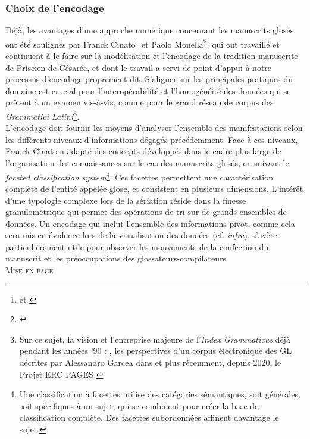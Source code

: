 \documentclass[a4paper, twoside, 12pt]{book}
\begin{document}
\subsubsection{Choix de l'encodage}

Déjà, les avantages d'une approche numérique concernant les manuscrits glosés ont été soulignés par Franck Cinato\footnote{\cite{cinato2015priscien} et \cite{cinato2011perspectives}} et Paolo Monella\footnote{\cite{monella2019digital}}, qui ont travaillé et continuent à le faire sur la modélisation et l'encodage de la tradition manuscrite de Priscien de Césarée, et dont le travail a servi de point d'appui à notre processus d'encodage proprement dit. S'aligner sur les principales pratiques du domaine est crucial pour l'interopérabilité et l'homogénéité des données qui se prêtent à un examen vis-à-vis, comme pour le grand réseau de corpus des \textit{Grammatici Latini}\footnote{Sur ce sujet, la vision et l'entreprise majeure de l'\textit{Index Grammaticus} déjà pendant les années '90 : \cite{lomanto1990index}, les perspectives d'un corpus électronique des GL décrites par Alessandro Garcea dans \cite{garcea2010corpus} et plus récemment, depuis 2020, le Projet ERC PAGES \cite{spangenberg2022pages}}.\\

L'encodage doit fournir les moyens d'analyser l'ensemble des manifestations selon les différents niveaux d'informations dégagés précédemment. Face à ces niveaux, Franck Cinato a adapté des concepts développés dans le cadre plus large de l'organisation des connaissances sur le cas des manuscrits glosés, en suivant le \textit{faceted classification system\footnote{Une classification à facettes utilise des catégories sémantiques, soit générales, soit spécifiques à un sujet, qui se combinent pour créer la base de classification complète. Des facettes subordonnées affinent davantage le sujet.}}. Ces facettes permettent une caractérisation complète de l'entité appelée glose, et consistent en plusieurs dimensions.  L'intérêt d'une typologie complexe lors de la sériation réside dans la \og{}finesse granulométrique\fg{} qui permet des opérations de tri sur de grands ensembles de données. Un encodage qui inclut l'ensemble des informations pivot, comme cela sera mis en évidence lors de la visualisation des données (cf. \textit{infra}), s'avère particulièrement utile pour observer les mouvements de la confection du manuscrit et les préoccupations des glossateurs-compilateurs.\\

\textsc{Mise en page}\\
\end{document}
